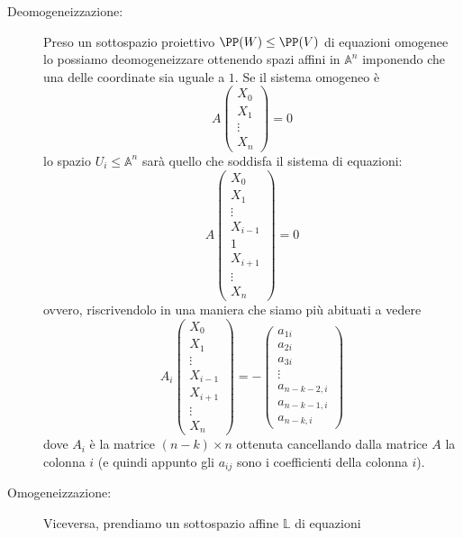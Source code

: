 \documentclass[11pt]{scrartcl}
\renewcommand{\AA}{\mathbb{A}}
\newcommand{\LL}{\mathbb{L}}
\begin{document}
   	 \begin{description}
   	 	\item[Deomogeneizzazione:] Preso un sottospazio proiettivo $\PP(W)\le \PP(V)$ di equazioni omogenee lo possiamo deomogeneizzare ottenendo spazi affini in $\AA^n$ imponendo che una delle coordinate sia uguale a $1$. Se il sistema omogeneo è
   	 	$$A\begin{pmatrix}
   	 		X_0 \\
   	 		X_1 \\
   	 		\vdots \\
   	 		X_n
   	 	\end{pmatrix}=0$$
   	 	lo spazio $U_i\le \AA^n$ sarà quello che soddisfa il sistema di equazioni:
   	 	$$A\begin{pmatrix}
   	 		X_0 \\
   	 		X_1 \\
   	 		\vdots \\
   	 		X_{i-1} \\
   	 		1 \\
   	 		X_{i+1} \\
   	 		\vdots \\
   	 		X_n
   	 	\end{pmatrix}=0$$
   	 	ovvero, riscrivendolo in una maniera che siamo più abituati a vedere
   	 	$$A_i\begin{pmatrix}
   	 		X_0 \\
   	 		X_1 \\
   	 		\vdots \\
   	 		X_{i-1} \\
   	 		X_{i+1} \\
   	 		\vdots \\
   	 		X_n
   	 	\end{pmatrix}=-\begin{pmatrix}
   	 	a_{1i} \\
   	 	a_{2i} \\
   	 	a_{3i} \\
   	 	\vdots \\
   	 	a_{n-k-2,i} \\
   	 	a_{n-k-1,i}\\
   	 	a_{n-k,i}
   	 	\end{pmatrix}$$
   	 	dove $A_i$ è la matrice $(n-k) \times n $ ottenuta cancellando dalla matrice $A$ la colonna $i$ (e quindi appunto gli $a_{ij}$ sono i coefficienti della colonna $i$).
   	 	\item[Omogeneizzazione:] Viceversa, prendiamo un sottospazio affine $\LL$ di equazioni

\end{description}
\end{document}
